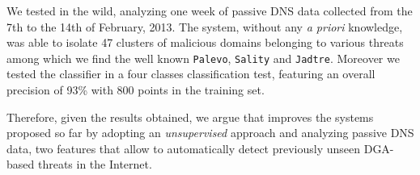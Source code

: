 We tested \thesystem in the wild, analyzing one week of passive DNS data collected
from the 7th to the 14th of February, 2013. The system, without any \emph{a priori} knowledge, was able to isolate
47 clusters of malicious domains belonging to various threats among which we find the well known \texttt{Palevo}, \texttt{Sality} and \texttt{Jadtre}.
Moreover we tested the classifier in a four classes classification test, featuring an overall
precision of 93\% with 800 points in the training set.

Therefore, given the results obtained, we argue that \thesystem improves the systems proposed so far by adopting an \emph{unsupervised} approach and analyzing
passive DNS data, two features that allow \thesystem to automatically detect
previously unseen DGA-based threats in the Internet.

